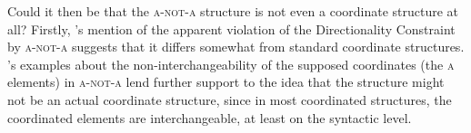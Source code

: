 \documentclass[12pt, UTF8]{article}
\begin{document}
Could it then be that the \textsc{a-not-a} structure is not even a coordinate structure at all? Firstly, \cite{Huang1991}'s mention of the apparent violation of the Directionality Constraint by \textsc{a-not-a} suggests that it differs somewhat from standard coordinate structures. \cite{McCawley1994}'s examples about the non-interchangeability of the supposed coordinates (the \textsc{a} elements) in \textsc{a-not-a} lend further support to the idea that the structure might not be an actual coordinate structure, since in most coordinated structures, the coordinated elements are interchangeable, at least on the syntactic level.

%
%
%
%
%
%
%
%
%
%
%
%
%
%
%
%
\end{document}
